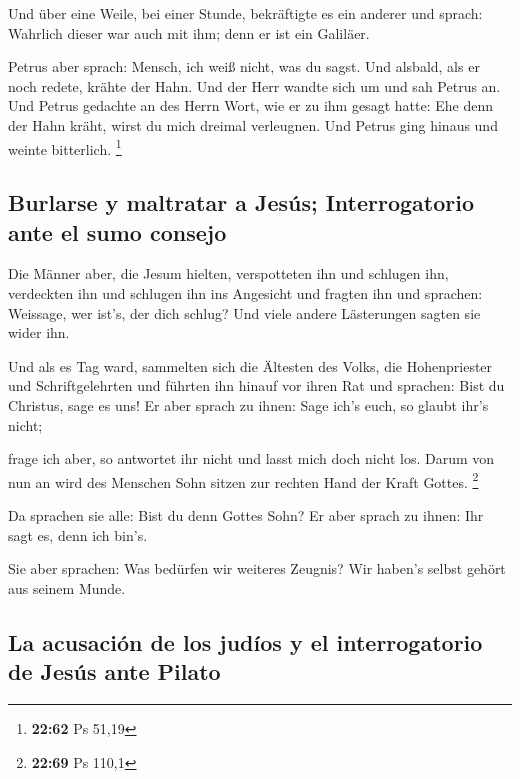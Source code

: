  Und über eine Weile, bei einer Stunde, bekräftigte es
ein anderer und sprach: Wahrlich dieser war auch mit ihm; denn er ist
ein Galiläer.

 Petrus aber sprach: Mensch, ich weiß nicht, was du
sagst. Und alsbald, als er noch redete, krähte der Hahn. 
Und der Herr wandte sich um und sah Petrus an. Und Petrus gedachte an
des Herrn Wort, wie er zu ihm gesagt hatte: Ehe denn der Hahn kräht,
wirst du mich dreimal verleugnen.  Und Petrus ging hinaus
und weinte bitterlich. \footnote{\textbf{22:62} Ps 51,19}

\hypertarget{burlarse-y-maltratar-a-jesuxfas-interrogatorio-ante-el-sumo-consejo}{%
\subsection{Burlarse y maltratar a Jesús; Interrogatorio ante el sumo
consejo}\label{burlarse-y-maltratar-a-jesuxfas-interrogatorio-ante-el-sumo-consejo}}

 Die Männer aber, die Jesum hielten, verspotteten ihn und
schlugen ihn,  verdeckten ihn und schlugen ihn ins
Angesicht und fragten ihn und sprachen: Weissage, wer ist's, der dich
schlug?  Und viele andere Lästerungen sagten sie wider
ihn.

 Und als es Tag ward, sammelten sich die Ältesten des
Volks, die Hohenpriester und Schriftgelehrten und führten ihn hinauf vor
ihren Rat  und sprachen: Bist du Christus, sage es uns!
Er aber sprach zu ihnen: Sage ich's euch, so glaubt ihr's nicht;

 frage ich aber, so antwortet ihr nicht und lasst mich
doch nicht los.  Darum von nun an wird des Menschen Sohn
sitzen zur rechten Hand der Kraft Gottes. \footnote{\textbf{22:69} Ps
  110,1}

 Da sprachen sie alle: Bist du denn Gottes Sohn? Er aber
sprach zu ihnen: Ihr sagt es, denn ich bin's.

 Sie aber sprachen: Was bedürfen wir weiteres Zeugnis?
Wir haben's selbst gehört aus seinem Munde.

\hypertarget{la-acusaciuxf3n-de-los-juduxedos-y-el-interrogatorio-de-jesuxfas-ante-pilato}{%
\subsection{La acusación de los judíos y el interrogatorio de Jesús ante
Pilato}\label{la-acusaciuxf3n-de-los-juduxedos-y-el-interrogatorio-de-jesuxfas-ante-pilato}}

